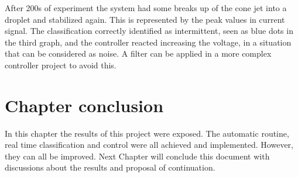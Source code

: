     After 200s of experiment the system had some breaks up of the cone jet into a droplet and stabilized again. This is represented by the peak values in current signal. The classification correctly identified as intermittent, seen as blue dots in the third graph, and the controller reacted increasing the voltage, in a situation that can be considered as noise. A filter can be applied in a more complex controller project to avoid this.
    


\section{Chapter conclusion}

In this chapter the results of this project were exposed. The automatic routine, real time classification and control were all achieved and implemented. However, they can all be improved. Next Chapter will conclude this document with discussions about the results and proposal of continuation.


\clearpage